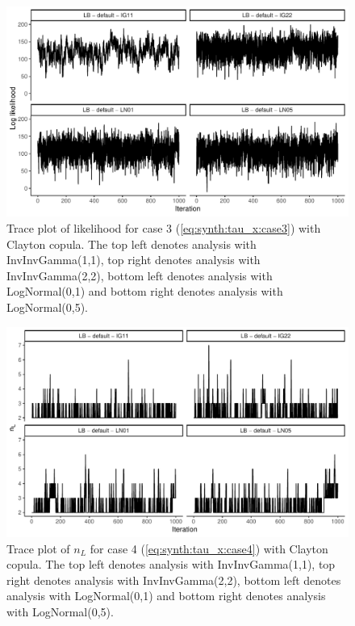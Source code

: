 \documentclass{amsart}
\begin{document}
\begin{figure}
	\centering
	\includegraphics[width = 0.75\linewidth]{trace_case3_clayton_like.pdf}
	\caption{Trace plot of likelihood for case 3 (\cref{eq:synth:tau_x:case3}) with Clayton copula. The top left denotes analysis with InvInvGamma(1,1), top right denotes analysis with InvInvGamma(2,2), bottom left denotes analysis with LogNormal(0,1) and bottom right denotes analysis with LogNormal(0,5).}
	\label{fig:case3:clayton:like}
\end{figure}

\begin{figure}
	\centering
	\includegraphics[width = 0.75\linewidth]{trace_case4_clayton_nterm.pdf}
	\caption{Trace plot of $n_L$ for case 4 (\cref{eq:synth:tau_x:case4}) with Clayton copula. The top left denotes analysis with InvInvGamma(1,1), top right denotes analysis with InvInvGamma(2,2), bottom left denotes analysis with LogNormal(0,1) and bottom right denotes analysis with LogNormal(0,5).}
	\label{fig:case4:clayton:nterm}
\end{figure}
\end{document}
